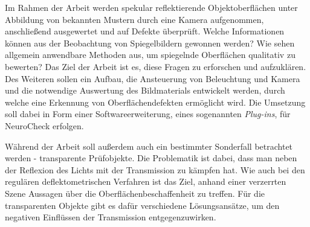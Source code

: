 Im Rahmen der Arbeit werden spekular reflektierende Objektoberflächen unter Abbildung von bekannten Mustern durch eine Kamera aufgenommen, anschließend ausgewertet und auf Defekte überprüft.
Welche Informationen können aus der Beobachtung von Spiegelbildern gewonnen werden?
Wie sehen allgemein anwendbare Methoden aus, um spiegelnde Oberflächen qualitativ zu bewerten?
Das Ziel der Arbeit ist es, diese Fragen zu erforschen und aufzuklären.
Des Weiteren sollen ein Aufbau, die Ansteuerung von Beleuchtung und Kamera und die notwendige Auswertung des Bildmaterials entwickelt werden, durch welche eine Erkennung von Oberflächendefekten ermöglicht wird.
Die Umsetzung soll dabei in Form einer Softwareerweiterung, eines sogenannten \textit{Plug-ins}, für NeuroCheck erfolgen.

\p
Während der Arbeit soll außerdem auch ein bestimmter Sonderfall betrachtet werden - transparente Prüfobjekte.
Die Problematik ist dabei, dass man neben der Reflexion des Lichts mit der Transmission zu kämpfen hat.
Wie auch bei den regulären deflektometrischen Verfahren ist das Ziel, anhand einer verzerrten Szene Aussagen über die Oberflächenbeschaffenheit zu treffen.
Für die transparenten Objekte gibt es dafür verschiedene Lösungsansätze, um den negativen Einflüssen der Transmission entgegenzuwirken.